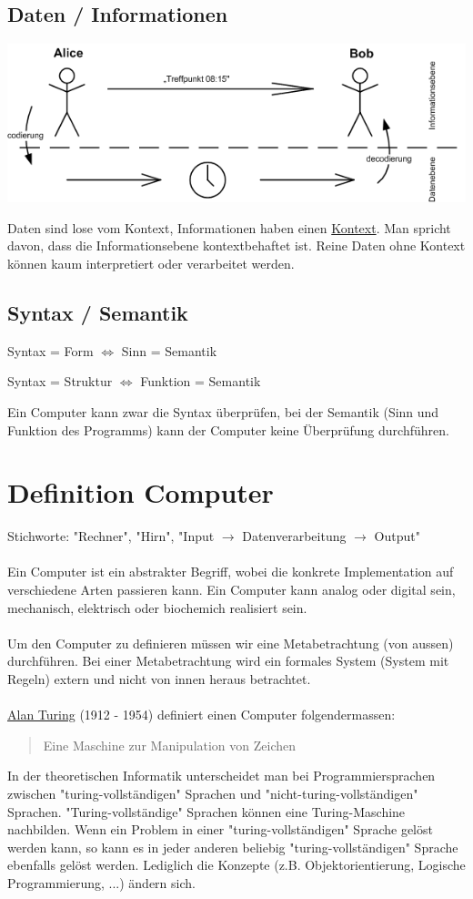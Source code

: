\documentclass{report}
\begin{document}
\subsection{Daten / Informationen}
\begin{center}\includegraphics[scale=0.5]{img/daten-information.png}\end{center}
Daten sind lose vom Kontext, Informationen haben einen \underline{Kontext}. Man spricht davon, dass die Informationsebene kontextbehaftet ist. Reine Daten ohne Kontext können kaum interpretiert oder verarbeitet werden.
\subsection{Syntax / Semantik}
\begin{center}Syntax = Form $\iff$ Sinn = Semantik\end{center}
\begin{center}Syntax = Struktur $\iff$ Funktion = Semantik\end{center}
Ein Computer kann zwar die Syntax überprüfen, bei der Semantik (Sinn und Funktion des Programms) kann der Computer keine Überprüfung durchführen.
\section{Definition Computer}
Stichworte: "Rechner", "Hirn", "Input $\to$ Datenverarbeitung $\to$ Output"\\\\
Ein Computer ist ein abstrakter Begriff, wobei die konkrete Implementation auf verschiedene Arten passieren kann. Ein Computer kann analog oder digital sein, mechanisch, elektrisch oder biochemich realisiert sein.\\\\
Um den Computer zu definieren müssen wir eine Metabetrachtung (von aussen) durchführen. Bei einer Metabetrachtung wird ein formales System (System mit Regeln) extern und nicht von innen heraus betrachtet.\\\\
\underline{Alan Turing} (1912 - 1954) definiert einen Computer folgendermassen:
\begin{quote}Eine Maschine zur Manipulation von Zeichen\end{quote}
In der theoretischen Informatik unterscheidet man bei Programmiersprachen zwischen "turing-vollständigen" Sprachen und "nicht-turing-vollständigen" Sprachen. "Turing-vollständige" Sprachen können eine Turing-Maschine nachbilden. Wenn ein Problem in einer "turing-vollständigen" Sprache gelöst werden kann, so kann es in jeder anderen beliebig "turing-vollständigen" Sprache ebenfalls gelöst werden. Lediglich die Konzepte (z.B. Objektorientierung, Logische Programmierung, ...) ändern sich.
\end{document}
